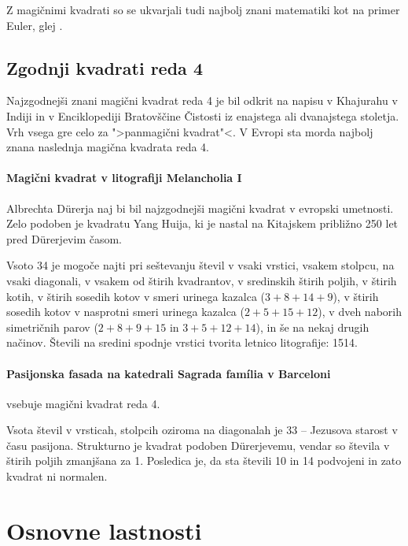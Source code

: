 \documentclass[a4paper,12pt]{article}
\begin{document}
Z magičnimi kvadrati so se ukvarjali tudi najbolj znani matematiki kot na
primer Euler, glej \cite{euler}. %


\subsection{Zgodnji kvadrati reda 4}

Najzgodnejši znani magični kvadrat reda 4 je bil odkrit na napisu
v Khajurahu v Indiji in v Enciklopediji Bratovščine Čistosti iz enajstega
ali dvanajstega stoletja. Vrh vsega gre celo za ">panmagični kvadrat"<.
V Evropi sta morda najbolj znana naslednja magična kvadrata reda 4.

\paragraph{Magični kvadrat v litografiji Melancholia I}
Albrechta Dürerja naj bi bil najzgodnejši magični kvadrat
v evropski umetnosti. Zelo podoben je kvadratu Yang Huija, ki je nastal na Kitajskem
približno 250 let pred Dürerjevim časom.

Vsoto 34 je mogoče najti pri seštevanju števil v vsaki vrstici, vsakem stolpcu,
na vsaki diagonali, v vsakem od štirih kvadrantov, v sredinskih štirih poljih,
v štirih kotih, v štirih sosedih kotov v smeri urinega kazalca (\(3+8+14+9\)), v
štirih sosedih kotov v nasprotni smeri urinega kazalca (\(2+5+15+12\)), v dveh naborih
simetričnih parov (\(2+8+9+15\) in \(3+5+12+14\)), in še na nekaj drugih načinov.
Števili na sredini spodnje vrstici tvorita letnico litografije: 1514.

\paragraph{Pasijonska fasada na katedrali Sagrada família v Barceloni}
vsebuje magični kvadrat reda 4.

Vsota števil v vrsticah, stolpcih oziroma na diagonalah je 33 -- Jezusova starost
v času pasijona. Strukturno je kvadrat podoben Dürerjevemu, vendar so števila
v štirih poljih zmanjšana za 1. Posledica je, da sta števili 10 in 14 podvojeni
in zato kvadrat ni normalen.


\section{Osnovne lastnosti}
\end{document}
